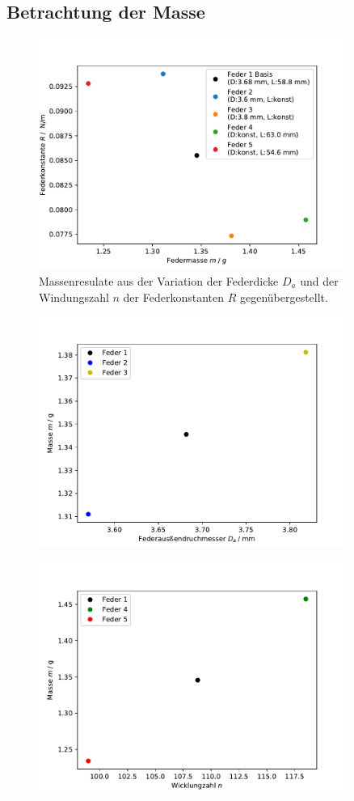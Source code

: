 \subsection{Betrachtung der Masse}
\begin{figure}[H]
  \center
  \includegraphics[width=0.9\textwidth]{plots/masse_konstante_dia.pdf}
  \caption{Massenresulate aus der Variation der Federdicke $D_a$
          und der Windungszahl $n$ der Federkonstanten $R$ gegenübergestellt. }
\end{figure}
\begin{figure}[H]
  \center
  \includegraphics[width=0.9\textwidth]{plots/m_D_dia.pdf}
  \caption{}
\end{figure}
\begin{figure}[H]
  \center
  \includegraphics[width=0.9\textwidth]{plots/m_n_dia.pdf}
  \caption{}
\end{figure}

\label{sec:Auswertung}
